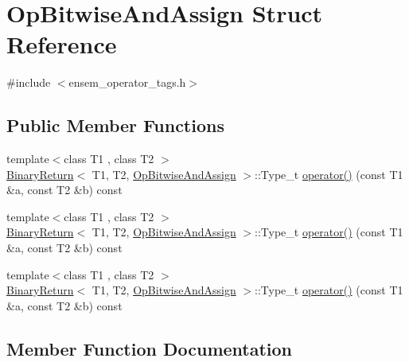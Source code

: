 \hypertarget{structOpBitwiseAndAssign}{}\section{Op\+Bitwise\+And\+Assign Struct Reference}
\label{structOpBitwiseAndAssign}


{\ttfamily \#include $<$ensem\+\_\+operator\+\_\+tags.\+h$>$}

\subsection*{Public Member Functions}
\begin{DoxyCompactItemize}
\item 
{\footnotesize template$<$class T1 , class T2 $>$ }\\\mbox{\hyperlink{structBinaryReturn}{Binary\+Return}}$<$ T1, T2, \mbox{\hyperlink{structOpBitwiseAndAssign}{Op\+Bitwise\+And\+Assign}} $>$\+::Type\+\_\+t \mbox{\hyperlink{structOpBitwiseAndAssign_a0ff733a94050f1eb8c0e52a8b1b27c01}{operator()}} (const T1 \&a, const T2 \&b) const
\item 
{\footnotesize template$<$class T1 , class T2 $>$ }\\\mbox{\hyperlink{structBinaryReturn}{Binary\+Return}}$<$ T1, T2, \mbox{\hyperlink{structOpBitwiseAndAssign}{Op\+Bitwise\+And\+Assign}} $>$\+::Type\+\_\+t \mbox{\hyperlink{structOpBitwiseAndAssign_a0ff733a94050f1eb8c0e52a8b1b27c01}{operator()}} (const T1 \&a, const T2 \&b) const
\item 
{\footnotesize template$<$class T1 , class T2 $>$ }\\\mbox{\hyperlink{structBinaryReturn}{Binary\+Return}}$<$ T1, T2, \mbox{\hyperlink{structOpBitwiseAndAssign}{Op\+Bitwise\+And\+Assign}} $>$\+::Type\+\_\+t \mbox{\hyperlink{structOpBitwiseAndAssign_a0ff733a94050f1eb8c0e52a8b1b27c01}{operator()}} (const T1 \&a, const T2 \&b) const
\end{DoxyCompactItemize}


\subsection{Member Function Documentation}
\mbox{\label{structOpBitwiseAndAssign_a0ff733a94050f1eb8c0e52a8b1b27c01}} 
